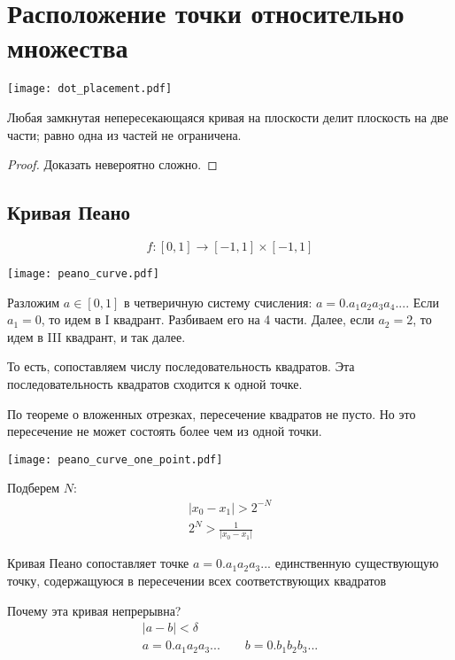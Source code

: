 \documentclass[main]{subfiles}
\begin{document}
\section{Расположение точки относительно множества}
\begin{center}
    \texttt{[image: dot\_placement.pdf]}
\end{center}
\begin{theorem}[Жордана]
    Любая замкнутая непересекающаяся кривая на плоскости делит
    плоскость на две части; равно одна из частей не ограничена.
\end{theorem}
\begin{proof}
    Доказать невероятно сложно.
\end{proof}

\subsection{Кривая Пеано}
\[f:[0,1] \to [-1,1] \times [-1,1]\]
\begin{center}
    \texttt{[image: peano\_curve.pdf]}
\end{center}
Разложим $a \in [0,1]$ в четверичную систему счисления: $a = 0.a_1 a_2 a_3 a_4 ...$.
Если $a_1 = 0$, то идем в I квадрант. Разбиваем его на 4 части.
Далее, если $a_2=2$, то идем в III квадрант, и так далее.

То есть, сопоставляем числу последовательность квадратов.
Эта последовательность квадратов сходится к одной точке.

По теореме о вложенных отрезках, пересечение квадратов не пусто.
Но это пересечение не может состоять более чем из одной точки.

\begin{minipage}{0.45\textwidth}
    \texttt{[image: peano\_curve\_one\_point.pdf]}
\end{minipage}
\begin{minipage}{0.45\textwidth}
    Подберем $N$:
    \begin{gather*}
        |x_0 - x_1| > 2^{-N}\\
        2^N > \frac{1}{|x_0 - x_1|}
    \end{gather*}
\end{minipage}

Кривая Пеано сопоставляет точке $a = 0.a_1 a_2 a_3...$ единственную
существующую точку, содержащуюся в пересечении всех соответствующих квадратов

Почему эта кривая непрерывна?
\begin{gather*}
    |a-b|<\delta\\
    a = 0. a_1 a_2 a_3 ... \qquad b = 0. b_1 b_2 b_3 ...
\end{gather*}
\end{document}
